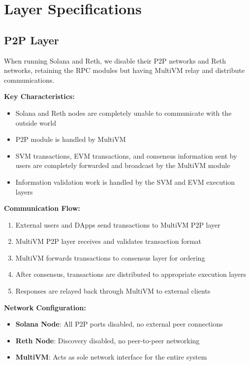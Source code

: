 \documentclass[11pt,a4paper]{article}
\begin{document}
\section{Layer Specifications}

\subsection{P2P Layer}
When running Solana and Reth, we disable their P2P networks and Reth networks, retaining the RPC modules but having MultiVM relay and distribute communications.

\textbf{Key Characteristics:}
\begin{itemize}
    \item Solana and Reth nodes are completely unable to communicate with the outside world
    \item P2P module is handled by MultiVM
    \item SVM transactions, EVM transactions, and consensus information sent by users are completely forwarded and broadcast by the MultiVM module
    \item Information validation work is handled by the SVM and EVM execution layers
\end{itemize}

\textbf{Communication Flow:}
\begin{enumerate}
    \item External users and DApps send transactions to MultiVM P2P layer
    \item MultiVM P2P layer receives and validates transaction format
    \item MultiVM forwards transactions to consensus layer for ordering
    \item After consensus, transactions are distributed to appropriate execution layers
    \item Responses are relayed back through MultiVM to external clients
\end{enumerate}

\textbf{Network Configuration:}
\begin{itemize}
    \item \textbf{Solana Node}: All P2P ports disabled, no external peer connections
    \item \textbf{Reth Node}: Discovery disabled, no peer-to-peer networking
    \item \textbf{MultiVM}: Acts as sole network interface for the entire system
\end{itemize}
\end{document}
